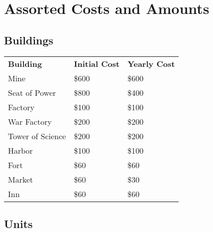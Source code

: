 
\chapter{Assorted Costs and Amounts}


\section{Buildings}

\begin{tabular}{|p{1.3in} p{1.3in} p{1.3in}|}
	\hline
	\textbf{Building} & \textbf{Initial Cost} & \textbf{Yearly Cost} \\ 
	\rowcolor{gray}Mine & \$600 & \$600 \\ 
	Seat of Power & \$800 & \$400 \\ 
	\rowcolor{gray}Factory	& \$100 & \$100 \\ 
	War Factory	& \$200 & \$200 \\ 
	\rowcolor{gray}Tower of Science & \$200 & \$200 \\ 
	Harbor & \$100 &\$100 \\ 
	\rowcolor{gray}Fort & \$60 & \$60 \\ 
	Market & \$60 & \$30 \\ 
	\rowcolor{gray}Inn	& \$60 & \$60 \\ 
	\hline
\end{tabular}	

\clearpage

\section{Units}

